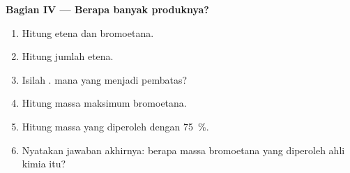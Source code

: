 \begin{problem}
\medskip
\noindent\textbf{Bagian IV --- Berapa banyak produknya?}
\begin{enumerate}[resume]
  \item Hitung  etena dan bromoetana.
  \item Hitung jumlah etena.
  \item Isilah .  mana yang menjadi pembatas?
  \item Hitung massa maksimum bromoetana.
  \item Hitung massa yang diperoleh dengan  \qty{75}{\percent}.
  \item Nyatakan jawaban akhirnya: berapa massa bromoetana yang diperoleh
        ahli kimia itu?
\end{enumerate}
\end{problem}
